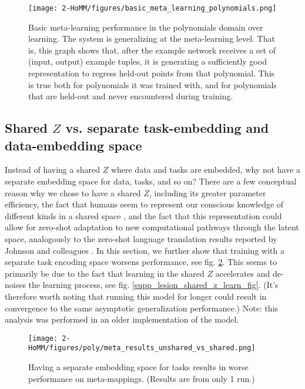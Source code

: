 \begin{figure}[H]
\centering
\texttt{[image: 2-HoMM/figures/basic\_meta\_learning\_polynomials.png]}
\caption[Basic meta-learning performance in the polynomials domain over learning.]{Basic meta-learning performance in the polynomials domain over learning. The system is generalizing at the meta-learning level. That is, this graph shows that, after the example network receives a set of (input, output) example tuples, it is generating a sufficiently good representation to regress held-out points from that polynomial. This is true both for polynomials it was trained with, and for polynomials that are held-out and never encountered during training.} \label{supp_fig:HoMM:polynomials_basic_meta_learning}
\end{figure}

\subsection{Shared $Z$ vs. separate task-embedding and data-embedding space} \label{app_lesion_results_shared_z}
Instead of having a shared $Z$ where data and tasks are embedded, why not have a separate embedding space for data, tasks, and so on? There are a few conceptual reason why we chose to have a shared $Z$, including its greater parameter efficiency, the fact that humans seem to represent our conscious knowledge of different kinds in a shared space \citep[][]{Baars2005}, and the fact that this representation could allow for zero-shot adaptation to new computational pathways through the latent space, analogously to the zero-shot language translation results reported by Johnson and colleagues \citep{Johnson2016a}. In this section, we further show that training with a separate task encoding space worsens performance, see fig. \ref{supp_lesion_shared_z_fig}. This seems to primarily be due to the fact that learning in the shared $Z$ accelerates and de-noises the learning process, see fig. \ref{supp_lesion_shared_z_learn_fig}. (It's therefore worth noting that running this model for longer could result in convergence to the same asymptotic generalization performance.) Note: this analysis was performed in an older implementation of the model. \par
\begin{figure}[H]
\centering
\texttt{[image: 2-HoMM/figures/poly/meta\_results\_unshared\_vs\_shared.png]}
\caption[Having a separate embedding space for tasks results in worse performance on meta-mappings.]{Having a separate embedding space for tasks results in worse performance on meta-mappings. (Results are from only 1 run.)}
\label{supp_lesion_shared_z_fig}
\end{figure}

